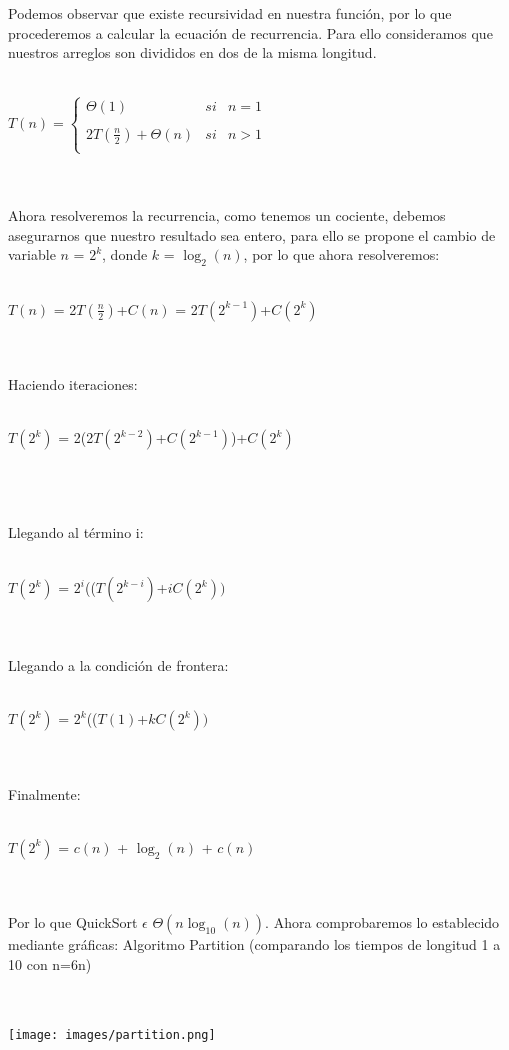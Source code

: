\documentclass[12pt,twoside]{article}
\begin{document}
Podemos observar que existe recursividad en nuestra funci\'on, por lo que procederemos a calcular la ecuaci\'on de recurrencia. Para ello consideramos que nuestros arreglos son divididos en dos de la misma longitud.\\\\
\centerline{$T(n)= \left\{\begin{array}{lcc}
             \Theta(1) &   si  & n = 1 \\
             \\ 2T(\frac{n}{2}) + \Theta(n) &  si & n > 1\\
             \end{array}
   \right.$}\\\\
Ahora resolveremos la recurrencia, como tenemos un cociente, debemos asegurarnos que nuestro resultado sea entero, para ello se propone el cambio de variable $n$ = $2^{k}$, donde $k$ = $\log_{2}(n)$, por lo que ahora resolveremos:\\\\
\centerline{$T(n)$ = 2$T(\frac{n}{2})$+$C(n)$ = 2$T(2^{k-1})$+$C(2^{k})$}\\\\\newpage
Haciendo iteraciones:\\\\
\centerline{$T(2^{k})$ = 2(2$T(2^{k-2})$+$C(2^{k-1})$)+$C(2^{k})$}\\\\\\
Llegando al t\'ermino i:\\\\
\centerline{$T(2^{k})$ = $2^{i}$(($T(2^{k-i})$+$iC(2^{k}))$}\\\\
Llegando a la condici\'on de frontera:\\\\
\centerline{$T(2^{k})$ = $2^{k}$(($T(1)$+$kC(2^{k}))$}\\\\
Finalmente:\\\\
\centerline{$T(2^{k})$ = $c(n)$ + $\log_{2}(n)$ + $c(n)$}\\\\
Por lo que QuickSort $\epsilon$ $\Theta(n\log_{10}(n))$. Ahora comprobaremos lo establecido mediante gr\'aficas:
Algoritmo Partition (comparando los tiempos de longitud 1 a 10 con n=6n)\\\\\
\centerline{\texttt{[image: images/partition.png]}}\\\\\newpage
\end{document}
